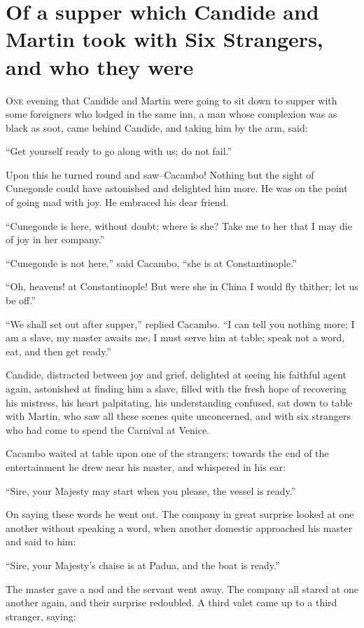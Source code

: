 \chapter{Of a supper which Candide and Martin took with Six Strangers, and who they were}
\lettrine[lraise=0.1,nindent=0em,slope=-.5em]{O}{ne} evening that Candide and Martin were going to sit down to supper with some foreigners who lodged in the same inn, a man whose complexion was as black as soot, came behind Candide, and taking him by the arm, said:

``Get yourself ready to go along with us; do not fail.''

Upon this he turned round and saw--Cacambo! Nothing but the sight of Cunegonde could have astonished and delighted him more. He was on the point of going mad with joy. He embraced his dear friend.

``Cunegonde is here, without doubt; where is she? Take me to her that I may die of joy in her company.''

``Cunegonde is not here,'' said Cacambo, ``she is at Constantinople.''

``Oh, heavens! at Constantinople! But were she in China I would fly thither; let us be off.''

``We shall set out after supper,'' replied Cacambo. ``I can tell you nothing more; I am a slave, my master awaits me, I must serve him at table; speak not a word, eat, and then get ready.''

Candide, distracted between joy and grief, delighted at seeing his faithful agent again, astonished at finding him a slave, filled with the fresh hope of recovering his mistress, his heart palpitating, his understanding confused, sat down to table with Martin, who saw all these scenes quite unconcerned, and with six strangers who had come to spend the Carnival at Venice.

Cacambo waited at table upon one of the strangers; towards the end of the entertainment he drew near his master, and whispered in his ear:

``Sire, your Majesty may start when you please, the vessel is ready.''

On saying these words he went out. The company in great surprise looked at one another without speaking a word, when another domestic approached his master and said to him:

``Sire, your Majesty's chaise is at Padua, and the boat is ready.''

The master gave a nod and the servant went away. The company all stared at one another again, and their surprise redoubled. A third valet came up to a third stranger, saying:

